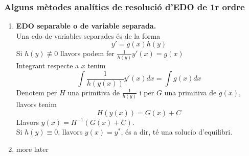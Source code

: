 \documentclass[../main.tex]{subfiles}
\begin{document}
\subsubsection{Alguns mètodes analítics de resolució d'EDO de 1r ordre}
\begin{enumerate}
    \item \textbf{EDO separable o de variable separada.}\\
    Una edo de variables separades és de la forma
    \begin{displaymath}
        y' = g\left(x\right) h\left(y\right)
    \end{displaymath}
    Si $h\left(y\right) \not\equiv 0$ llavors podem fer $\frac{1}{h\left(y\right)} y'\left(x\right) = g\left(x\right)$\\
    Integrant respecte a $x$ tenim
    \begin{displaymath}
        \int \frac{1}{h\left(y(x)\right)} y'(x) dx = \int g(x) dx
    \end{displaymath}
    Denotem per $H$ una primitiva de $\frac{1}{h\left(y\right)}$ i per $G$ una primitiva de $g(x)$,
    llavors tenim
    \begin{displaymath}
        H(y(x)) = G(x) + C
    \end{displaymath}
    Llavors $y(x) = H^{-1}\left(G(x)+C\right)$.\\
    Si $h\left(y\right) \equiv 0$, llavors $y(x) = y^*$, és a dir, té una solucío d'equilibri.
    \item more later
\end{enumerate}
\end{document}
